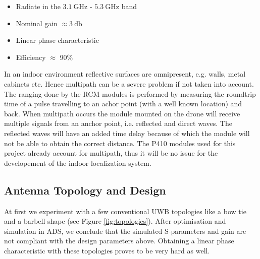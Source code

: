\documentclass[a4paper]{article}        %
\begin{document}
	\begin{itemize}
		\item Radiate in the $\SI{3.1}{\giga\hertz}$ - $\SI{5.3}{\giga\hertz}$ band
		\item Nominal gain $\approx \SI{3}{\decibel}$
		\item Linear phase characteristic
		\item Efficiency $\approx$ 90\%	

	\end{itemize}

	In an indoor environment reflective surfaces are omnipresent, e.g. walls, metal cabinets etc. Hence multipath can be a severe problem if not taken into account. The ranging done by the RCM modules is performed by measuring the roundtrip time of a pulse travelling to an achor point (with a well known location) and back. When multipath occurs the module mounted on the drone will receive multiple signals from an anchor point, i.e. reflected and direct waves. The reflected waves will have an added time delay because of which the module will not be able to obtain the correct distance. 
	The P410 modules used for this project already account for multipath, thus it will be no issue for the developement of the indoor localization system.  

	\subsection{Antenna Topology and Design}
	\label{subsec:ant_design}

	At first we experiment with a few conventional UWB topologies like a bow tie and a barbell shape (see Figure \ref{fig:topologies}). After optimisation and simulation in ADS, we conclude that the simulated S-parameters and gain are not compliant with the design parameters above. Obtaining a linear phase characteristic with these topologies proves to be very hard as well.  
\end{document}
